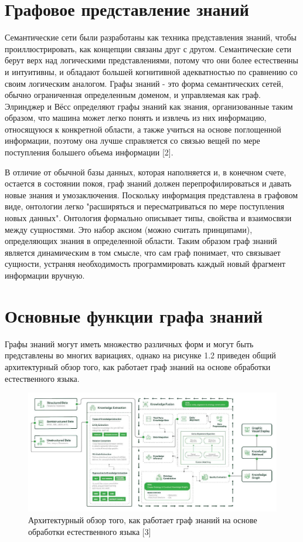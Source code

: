 \section{Графовое представление знаний}

Семантические сети были разработаны как техника представления знаний, чтобы проиллюстрировать, как концепции связаны друг с другом.
Семантические сети берут верх над логическими представлениями, потому что они более естественны и интуитивны, и обладают большей когнитивной
адекватностью по сравнению со своим логическим аналогом. Графы знаний - это форма семантических сетей, обычно ограниченная определенным
доменом, и управляемая как граф. Элринджер и Вёсс определяют графы знаний как знания, организованные таким образом, что машина может легко
понять и извлечь из них информацию, относящуюся к конкретной области, а также учиться на основе поглощенной информации, поэтому она лучше
справляется со связью вещей по мере поступления большего объема информации [2].

В отличие от обычной базы данных, которая наполняется и, в конечном счете, остается в состоянии покоя, граф знаний должен перепрофилироваться
и давать новые знания и умозаключения. Поскольку информация представлена в графовом виде, онтологии легко "расширяться и пересматриваться
по мере поступления новых данных". Онтология формально описывает типы, свойства и взаимосвязи между сущностями. Это набор аксиом (можно
считать принципами), определяющих знания в определенной области. Таким образом граф знаний является динамическим в том смысле, что сам граф
понимает, что связывает сущности, устраняя необходимость программировать каждый новый фрагмент информации вручную.


\section{Основные функции графа знаний}

Графы знаний могут иметь множество различных форм и могут быть представлены во многих вариациях, однако на рисунке 1.2 приведен общий
архитектурный обзор того, как работает граф знаний на основе обработки естественного языка.

\begin{figure}[ht!]
    \center
    \includegraphics [scale=0.32] {my_folder/myimg//2}
    \caption{Архитектурный обзор того, как работает граф знаний на основе обработки естественного языка [3]}
\end{figure}

